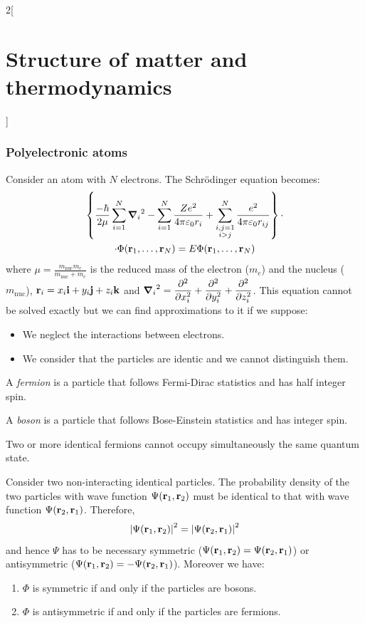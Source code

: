 \documentclass[../../../main_physics.tex]{subfiles}
\begin{document}
\begin{multicols}{2}[\section{Structure of matter and thermodynamics}]
  \subsubsection{Polyelectronic atoms}
  \begin{proposition}
    Consider an atom with $N$ electrons. The Schrödinger equation becomes:
    \begin{multline*}
      \left\{\frac{-\hbar}{2\mu}\sum_{i=1}^N{\grad_i}^2-\sum_{i=1}^N\frac{Ze^2}{4\pi\varepsilon_0r_i}+\sum_{\substack{i,j=1\\i>j}}^N\frac{e^2}{4\pi\varepsilon_0r_{ij}}\right\}\cdot\\\cdot\Phi(\boldsymbol{\mathrm{r}}_1,\ldots,\boldsymbol{\mathrm{r}}_N)=E\Phi(\boldsymbol{\mathrm{r}}_1,\ldots,\boldsymbol{\mathrm{r}}_N)
    \end{multline*}
    where $\displaystyle\mu=\frac{m_\text{nuc}m_e}{m_\text{nuc}+m_e}$ is the reduced mass of the electron ($m_e$) and the nucleus ($m_\text{nuc}$), $\boldsymbol{\mathrm{r}}_i=x_i\boldsymbol{\mathrm{i}}+y_i\boldsymbol{\mathrm{j}}+z_i\boldsymbol{\mathrm{k}}$ and $\displaystyle{\grad_i}^2=\pdv[2]{}{x_i}+\pdv[2]{}{y_i}+\pdv[2]{}{z_i}$.
    This equation cannot be solved exactly but we can find approximations to it if we suppose:
    \begin{itemize}
      \item We neglect the interactions between electrons.
      \item We consider that the particles are identic and we cannot distinguish them.
    \end{itemize}
  \end{proposition}
  \begin{definition}[Fermions]
    A \emph{fermion} is a particle that follows Fermi-Dirac statistics and has half integer spin.
  \end{definition}
  \begin{definition}[Boson]
    A \emph{boson} is a particle that follows Bose-Einstein statistics and has integer spin.
  \end{definition}
  \begin{proposition}
    Two or more identical fermions cannot occupy simultaneously the same quantum state.
  \end{proposition}
  \begin{proposition}
    Consider two non-interacting identical particles. The probability density of the two particles with wave function $\Psi(\boldsymbol{\mathrm{r}}_1,\boldsymbol{\mathrm{r}}_2)$ must be identical to that with wave function $\Psi(\boldsymbol{\mathrm{r}}_2,\boldsymbol{\mathrm{r}}_1)$. Therefore, $${|\Psi(\boldsymbol{\mathrm{r}}_1,\boldsymbol{\mathrm{r}}_2)|}^2={|\Psi(\boldsymbol{\mathrm{r}}_2,\boldsymbol{\mathrm{r}}_1)|}^2$$ and hence $\Psi$ has to be necessary symmetric ($\Psi(\boldsymbol{\mathrm{r}}_1,\boldsymbol{\mathrm{r}}_2)=\Psi(\boldsymbol{\mathrm{r}}_2,\boldsymbol{\mathrm{r}}_1)$) or antisymmetric ($\Psi(\boldsymbol{\mathrm{r}}_1,\boldsymbol{\mathrm{r}}_2)=-\Psi(\boldsymbol{\mathrm{r}}_2,\boldsymbol{\mathrm{r}}_1)$). Moreover we have:
    \begin{enumerate}
      \item $\Phi$ is symmetric if and only if the particles are bosons.
      \item $\Phi$ is antisymmetric if and only if the particles are fermions.
    \end{enumerate}
  \end{proposition}

\end{multicols}
\end{document}
